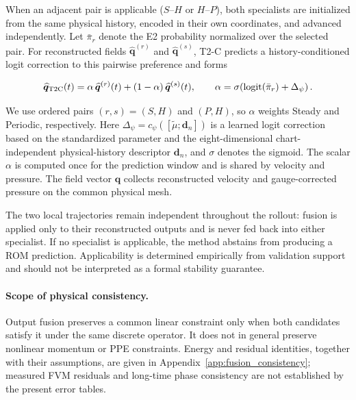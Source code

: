 \documentclass{article}
\providecommand{\DIFaddtex}[1]{{\protect\color{blue} \sf #1}} %
\providecommand{\DIFaddbegin}{} %
\providecommand{\DIFaddend}{} %
\providecommand{\DIFadd}[1]{\texorpdfstring{\DIFaddtex{#1}}{#1}} %
\begin{document}
When an adjacent pair is applicable ($S$--$H$ or $H$--$P$), both specialists are initialized from the same physical history, encoded in
their own coordinates, and advanced independently. Let $\bar\pi_r$ denote the E2 probability normalized over the selected pair. For reconstructed fields $\widehat{\bm q}^{(r)}$ and $\widehat{\bm q}^{(s)}$, T2-C predicts a history-conditioned logit correction to this pairwise preference and forms


\begin{equation}
  \widehat{\bm q}_{\rm T2C}(t)
  =\alpha\,\widehat{\bm q}^{(r)}(t)
  +(1-\alpha)\,\widehat{\bm q}^{(s)}(t),
  \qquad
  \alpha=
  \sigma\!\left(
  \operatorname{logit}(\bar\pi_r)+\Delta_\psi
  \right).
  \label{eq:main_t2c}
\end{equation}


\DIFaddbegin \DIFadd{We use ordered pairs $(r,s)=(S,H)$ and $(P,H)$, so $\alpha$ weights Steady and Periodic, respectively. }\DIFaddend Here $\Delta_\psi=c_\psi([\widetilde\mu;\bm d_n])$ is a learned logit correction based on the standardized parameter and the \DIFaddbegin \DIFadd{eight-dimensional }\DIFaddend chart-independent physical-history descriptor $\bm d_n$, and $\sigma$ denotes the sigmoid. The scalar $\alpha$ is computed once for the prediction window and is shared by velocity and pressure. The field vector $\bm q$ collects reconstructed velocity and gauge-corrected pressure on the common physical mesh.

The two local trajectories remain independent throughout the rollout: fusion is applied only to their reconstructed outputs and is never fed back into either specialist. If no specialist is applicable, the method abstains from producing a ROM prediction. Applicability is determined empirically from validation support and should not be interpreted as a formal stability guarantee.


\DIFaddbegin \paragraph{\DIFadd{Scope of physical consistency.}}
\DIFadd{Output fusion preserves a common linear constraint only when both
candidates satisfy it under the same discrete operator. It does not in
general preserve nonlinear momentum or PPE constraints. Energy and
residual identities, together with their assumptions, are given in
Appendix~\ref{app:fusion_consistency}; measured FVM residuals and long-time
phase consistency are not established by the present error tables.
}
\end{document}
